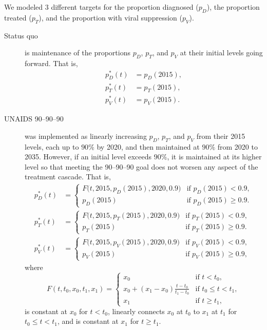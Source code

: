 \documentclass{article}
\begin{document}
We modeled 3 different targets for the proportion diagnosed ($p_D$), the
proportion treated ($p_T$), and the proportion with viral suppression ($p_V$).
\begin{description}
\item[Status quo] is maintenance of the proportions $p_D$, $p_T$, and
  $p_V$ at their initial levels going forward.  That is,
  \begin{equation}
    \label{status_quo_target}
    \begin{split}
      p_D^*(t) &= p_D(2015), \\
      p_T^*(t) &= p_T(2015), \\
      p_V^*(t) &= p_V(2015).
    \end{split}
  \end{equation}

\item[UNAIDS 90--90--90] was implemented as linearly increasing $p_D$,
  $p_T$, and $p_V$ from their 2015 levels, each up to $90\%$ by 2020,
  and then maintained at $90\%$ from 2020 to 2035.  However, if an
  initial level exceeds $90\%$, it is maintained at its higher level
  so that meeting the 90--90--90 goal does not worsen any aspect of
  the treatment cascade.  That is,
  \begin{equation}
    \label{unaids90_targets}
    \begin{split}
      p_D^*(t) &=
      \begin{cases}
        F\big(t, 2015, p_D(2015), 2020, 0.9\big)
        & \text{if $p_D(2015) < 0.9$},
        \\
        p_D(2015) & \text{if $p_D(2015) \geq 0.9$}.
      \end{cases}
      \\
      p_T^*(t) &=
      \begin{cases}
        F\big(t, 2015, p_T(2015), 2020, 0.9\big)
        & \text{if $p_T(2015) < 0.9$},
        \\
        p_T(2015) & \text{if $p_T(2015) \geq 0.9$}.
      \end{cases}
      \\
      p_V^*(t) &=
      \begin{cases}
        F\big(t, 2015, p_V(2015), 2020, 0.9\big)
        & \text{if $p_V(2015) < 0.9$},
        \\
        p_V(2015) & \text{if $p_V(2015) \geq 0.9$},
      \end{cases}
    \end{split}
  \end{equation}
  where
  \begin{equation}
    \label{F}
    F(t, t_0, x_0, t_1, x_1) =
    \begin{cases}
      x_0 & \text{if $t < t_0$},
      \\
      x_0 + (x_1 - x_0) \frac{t - t_0}{t_1 - t_0} &
      \text{if $t_0 \leq t < t_1$},
      \\
      x_1 & \text{if $t \geq t_1$},
    \end{cases}
  \end{equation}
  is constant at $x_0$ for $t < t_0$, linearly connects $x_0$ at
  $t_0$ to $x_1$ at $t_1$ for $t_0 \leq t < t_1$, and is constant at
  $x_1$ for $t \geq t_1$.


\end{description}
\end{document}

